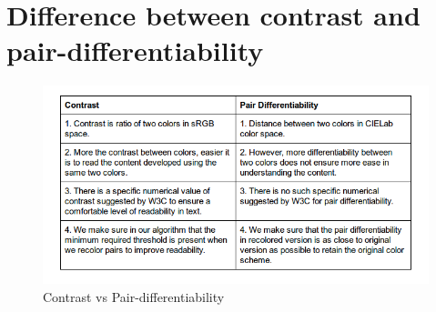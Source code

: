 \section{Difference between contrast and pair-differentiability}

\begin{figure}
\centering
\includegraphics[width=\linewidth]{comparison.png}
\caption{Contrast vs Pair-differentiability}
\label{fig:test}
\end{figure}


